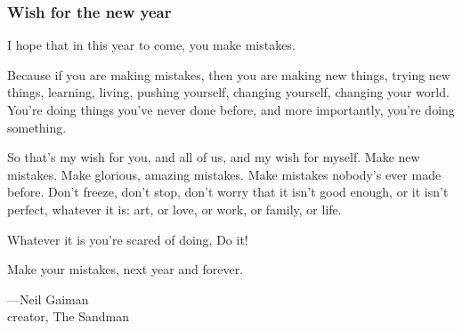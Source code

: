 \documentclass{beamer}
\newcommand{\bfr}[1]{\begin{frame}[fragile]\frametitle{{ #1 }}}
\begin{document}
\bfr{Wish for the new year}

\setlength{\parindent}{0em}
\setlength{\parskip}{1ex}
\sl

I hope that in this year to come, you make mistakes.

Because if you are making mistakes, then you are making new things,
trying new things, learning, living, pushing yourself, changing
yourself, changing your world. You're doing things you've never done
before, and more importantly, you're doing something.

So that's my wish for you, and all of us, and my wish for myself. Make
new mistakes. Make glorious, amazing mistakes. Make mistakes nobody's
ever made before. Don't freeze, don't stop, don't worry that it isn't
good enough, or it isn't perfect, whatever it is: art, or love, or
work, or family, or life.

Whatever it is you're scared of doing, Do it!

Make your mistakes, next year and forever.

\hfill ---Neil Gaiman
\\
\hfill creator, The Sandman

\end{frame}
\end{document}
